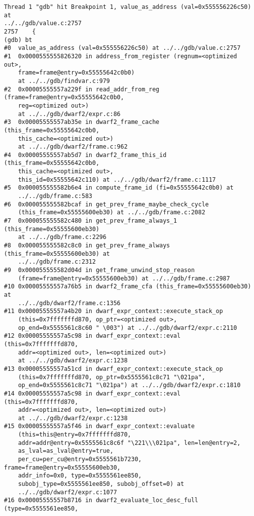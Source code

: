 \documentclass{report}
\begin{document}
\begin{verbatim}
Thread 1 "gdb" hit Breakpoint 1, value_as_address (val=0x555556226c50) at 
../../gdb/value.c:2757
2757	{
(gdb) bt
#0  value_as_address (val=0x555556226c50) at ../../gdb/value.c:2757
#1  0x0000555555826320 in address_from_register (regnum=<optimized out>,
    frame=frame@entry=0x55555642c0b0)
    at ../../gdb/findvar.c:979
#2  0x00005555557a229f in read_addr_from_reg (frame=frame@entry=0x55555642c0b0,
    reg=<optimized out>)
    at ../../gdb/dwarf2/expr.c:86
#3  0x00005555557ab35e in dwarf2_frame_cache (this_frame=0x55555642c0b0, 
    this_cache=<optimized out>)
    at ../../gdb/dwarf2/frame.c:962
#4  0x00005555557ab5d7 in dwarf2_frame_this_id (this_frame=0x55555642c0b0, 
    this_cache=<optimized out>, 
    this_id=0x55555642c110) at ../../gdb/dwarf2/frame.c:1117
#5  0x000055555582b6e4 in compute_frame_id (fi=0x55555642c0b0) at 
    ../../gdb/frame.c:583
#6  0x000055555582bcaf in get_prev_frame_maybe_check_cycle 
    (this_frame=0x55555600eb30) at ../../gdb/frame.c:2082
#7  0x000055555582c480 in get_prev_frame_always_1 (this_frame=0x55555600eb30) 
    at ../../gdb/frame.c:2296
#8  0x000055555582c8c0 in get_prev_frame_always (this_frame=0x55555600eb30) at
    ../../gdb/frame.c:2312
#9  0x000055555582d04d in get_frame_unwind_stop_reason 
    (frame=frame@entry=0x55555600eb30) at ../../gdb/frame.c:2987
#10 0x00005555557a76b5 in dwarf2_frame_cfa (this_frame=0x55555600eb30) at 
    ../../gdb/dwarf2/frame.c:1356
#11 0x00005555557a4b20 in dwarf_expr_context::execute_stack_op 
    (this=0x7fffffffd870, op_ptr=<optimized out>, 
    op_end=0x5555561c8c60 " \003") at ../../gdb/dwarf2/expr.c:2110
#12 0x00005555557a5c98 in dwarf_expr_context::eval (this=0x7fffffffd870, 
    addr=<optimized out>, len=<optimized out>)
    at ../../gdb/dwarf2/expr.c:1238
#13 0x00005555557a51cd in dwarf_expr_context::execute_stack_op 
    (this=0x7fffffffd870, op_ptr=0x5555561c8c71 "\021pa", 
    op_end=0x5555561c8c71 "\021pa") at ../../gdb/dwarf2/expr.c:1810
#14 0x00005555557a5c98 in dwarf_expr_context::eval (this=0x7fffffffd870, 
    addr=<optimized out>, len=<optimized out>)
    at ../../gdb/dwarf2/expr.c:1238
#15 0x00005555557a5f46 in dwarf_expr_context::evaluate 
    (this=this@entry=0x7fffffffd870, 
    addr=addr@entry=0x5555561c8c6f "\221\\\021pa", len=len@entry=2, 
    as_lval=as_lval@entry=true, 
    per_cu=per_cu@entry=0x5555561b7230, frame=frame@entry=0x55555600eb30, 
    addr_info=0x0, type=0x5555561ee850, 
    subobj_type=0x5555561ee850, subobj_offset=0) at 
    ../../gdb/dwarf2/expr.c:1077
#16 0x00005555557b8716 in dwarf2_evaluate_loc_desc_full (type=0x5555561ee850, 

\end{verbatim}
\end{document}

